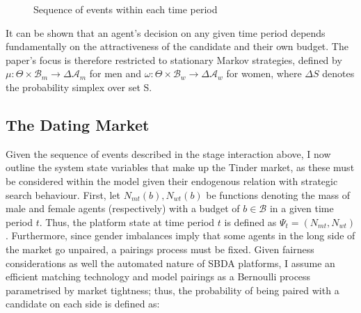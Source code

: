 \begin{figure}[ht]
    \centering 
    \caption{Sequence of events within each time period}
    \vspace{20pt} 
    \label{fig:timeline}
\end{figure}

It can be shown that an agent’s decision on any given time period depends fundamentally on the attractiveness of the candidate and their own budget. The paper's focus is therefore restricted to stationary Markov strategies, defined by $\mu: \Theta \times\mathcal{B}_m\rightarrow \Delta\mathcal{A}_m$ for men and $\omega:\Theta \times\mathcal{B}_w\rightarrow \Delta\mathcal{A}_w$ for women, where $\Delta S$ denotes the probability simplex over set S. 

\subsection{The Dating Market}\label{sec:section2.2}
Given the sequence of events described in the stage interaction above, I now outline the system state variables that make up the Tinder market, as these must be considered within the model given their endogenous relation with strategic search behaviour. First, let $N_{mt}(b), N_{wt}(b)$ be functions denoting the mass of male and female agents (respectively) with a budget of $b\in\mathcal{B}$ in a given time period $t$. Thus, the platform state at time period $t$ is defined as $\Psi_t=(N_{mt},N_{wt})$. Furthermore, since gender imbalances imply that some agents in the long side of the market go unpaired, a pairings process must be fixed. Given fairness considerations as well the automated nature of SBDA platforms, I assume an efficient matching technology and model pairings as a Bernoulli process parametrised by market tightness; thus, the probability of being paired with a candidate on each side is defined as:

